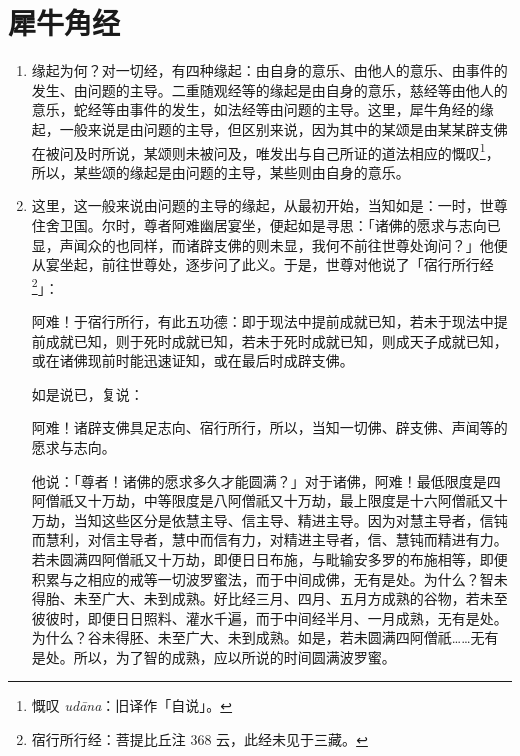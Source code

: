 \section{犀牛角经}

\begin{enumerate}\item 缘起为何？对一切经，有四种缘起：由自身的意乐、由他人的意乐、由事件的发生、由问题的主导。二重随观经等的缘起是由自身的意乐，慈经等由他人的意乐，蛇经等由事件的发生，如法经等由问题的主导。这里，犀牛角经的缘起，一般来说是由问题的主导，但区别来说，因为其中的某颂是由某某辟支佛在被问及时所说，某颂则未被问及，唯发出与自己所证的道法相应的慨叹\footnote{慨叹 \textit{udāna}：旧译作「自说」。}，所以，某些颂的缘起是由问题的主导，某些则由自身的意乐。
\item 这里，这一般来说由问题的主导的缘起，从最初开始，当知如是：一时，世尊住舍卫国。尔时，尊者阿难幽居宴坐，便起如是寻思：「诸佛的愿求与志向已显，声闻众的也同样，而诸辟支佛的则未显，我何不前往世尊处询问？」他便从宴坐起，前往世尊处，逐步问了此义。于是，世尊对他说了「宿行所行经\footnote{宿行所行经：菩提比丘注 368 云，此经未见于三藏。}」：\begin{quoting}阿难！于宿行所行，有此五功德：即于现法中提前成就已知，若未于现法中提前成就已知，则于死时成就已知，若未于死时成就已知，则成天子成就已知，或在诸佛现前时能迅速证知，或在最后时成辟支佛。\end{quoting}如是说已，复说：\begin{quoting}阿难！诸辟支佛具足志向、宿行所行，所以，当知一切佛、辟支佛、声闻等的愿求与志向。\end{quoting}他说：「尊者！诸佛的愿求多久才能圆满？」对于诸佛，阿难！最低限度是四阿僧祇又十万劫，中等限度是八阿僧祇又十万劫，最上限度是十六阿僧祇又十万劫，当知这些区分是依慧主导、信主导、精进主导。因为对慧主导者，信钝而慧利，对信主导者，慧中而信有力，对精进主导者，信、慧钝而精进有力。若未圆满四阿僧祇又十万劫，即便日日布施，与毗输安多罗的布施相等，即便积累与之相应的戒等一切波罗蜜法，而于中间成佛，无有是处。为什么？智未得胎、未至广大、未到成熟。好比经三月、四月、五月方成熟的谷物，若未至彼彼时，即便日日照料、灌水千遍，而于中间经半月、一月成熟，无有是处。为什么？谷未得胚、未至广大、未到成熟。如是，若未圆满四阿僧祇……无有是处。所以，为了智的成熟，应以所说的时间圆满波罗蜜。

\end{enumerate}
